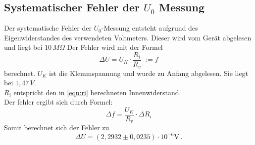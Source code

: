   \subsection{Systematischer Fehler der $U_0$ Messung}

Der systematische Fehler der $U_0$-Messung entsteht aufgrund des Eigenwiderstandes
des verwendeten Voltmeters.
Dieser wird vom Gerät abgelesen und liegt bei $10\, M\Omega$
Der Fehler wird mit der Formel
\begin{equation}
  \Delta U = U_K \cdot \frac{R_i}{R_v}\,\, := f
\end{equation}
berechnet. $U_K$ ist die Klemmspannung und wurde zu Anfang abgelesen.
Sie liegt bei $1,47 \, V$. \\
$R_i$ entspricht den in \ref{eqn:ri} berechneten Innenwiderstand.
\\
Der fehler ergibt sich durch Formel:
\begin{equation*}
  \Delta f = \frac{U_K}{R_v}\cdot\Delta R_i
\end{equation*}
Somit berechnet sich der Fehler zu
\begin{equation*}
  \Delta U = (2,2932 \pm 0,0235) \cdot 10^{-6} \mathrm{V}\, .
\end{equation*}


